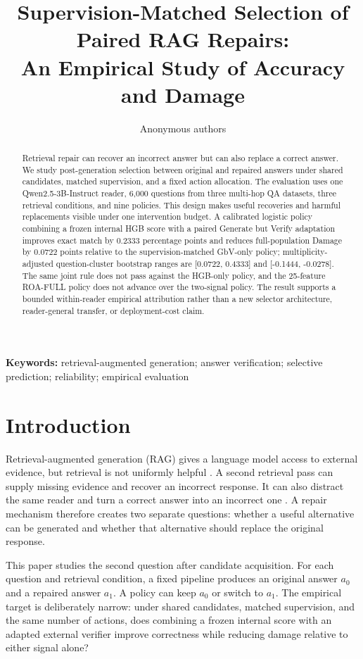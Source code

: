 \documentclass[11pt]{article}
\title{Supervision-Matched Selection of Paired RAG Repairs:\\An Empirical Study of Accuracy and Damage}
\author{Anonymous authors}
\date{}
\begin{document}
\maketitle

\begin{abstract}
Retrieval repair can recover an incorrect answer but can also replace a correct answer. We study post-generation selection between original and repaired answers under shared candidates, matched supervision, and a fixed action allocation. The evaluation uses one Qwen2.5-3B-Instruct reader, 6,000 questions from three multi-hop QA datasets, three retrieval conditions, and nine policies. This design makes useful recoveries and harmful replacements visible under one intervention budget. A calibrated logistic policy combining a frozen internal HGB score with a paired Generate but Verify adaptation improves exact match by 0.2333 percentage points and reduces full-population Damage by 0.0722 points relative to the supervision-matched GbV-only policy; multiplicity-adjusted question-cluster bootstrap ranges are [0.0722, 0.4333] and [-0.1444, -0.0278]. The same joint rule does not pass against the HGB-only policy, and the 25-feature ROA-FULL policy does not advance over the two-signal policy. The result supports a bounded within-reader empirical attribution rather than a new selector architecture, reader-general transfer, or deployment-cost claim.
\end{abstract}

\noindent\textbf{Keywords:} retrieval-augmented generation; answer verification; selective prediction; reliability; empirical evaluation

\section{Introduction}
Retrieval-augmented generation (RAG) gives a language model access to external evidence, but retrieval is not uniformly helpful \citep{lewis2020rag,wang2023skr,oh2023detrimental}. A second retrieval pass can supply missing evidence and recover an incorrect response. It can also distract the same reader and turn a correct answer into an incorrect one \citep{amiraz2025distracting}. A repair mechanism therefore creates two separate questions: whether a useful alternative can be generated and whether that alternative should replace the original response.

This paper studies the second question after candidate acquisition. For each question and retrieval condition, a fixed pipeline produces an original answer $a_0$ and a repaired answer $a_1$. A policy can keep $a_0$ or switch to $a_1$. The empirical target is deliberately narrow: under shared candidates, matched supervision, and the same number of actions, does combining a frozen internal score with an adapted external verifier improve correctness while reducing damage relative to either signal alone?
\end{document}
